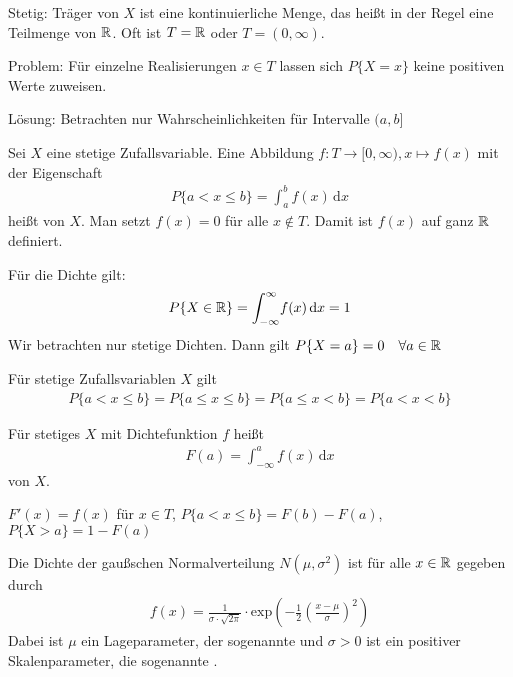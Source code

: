
Stetig: Träger von $X$ ist eine kontinuierliche Menge, das heißt in der Regel eine Teilmenge von $\mathbb{R}$. Oft ist $T = \mathbb{R}$ oder $T = (0, \infty)$.

\medskip
Problem: Für einzelne Realisierungen $x \in T$ lassen sich $P\{X = x\}$ keine positiven Werte zuweisen.

\medskip
Lösung: Betrachten nur Wahrscheinlichkeiten für Intervalle $(a, b]$

Sei $X$ eine stetige Zufallsvariable. Eine Abbildung $f:T \rightarrow [0, \infty), x \mapsto f(x)$ mit der Eigenschaft
\begin{align*}
    P\{a < x \leq b\} = \int_a^b \! f(x) \, \mathrm{d}x
\end{align*}
heißt  von $X$. Man setzt $f(x) = 0$ für alle $x \not \in T$. Damit ist $f(x)$ auf ganz $\mathbb{R}$ definiert.

Für die Dichte gilt:
\begin{align*}
    P\{X \in \mathbb{R}\} = \int_{-\infty}^{\infty} \! f(x) \, \mathrm{d}x = 1
\end{align*}
Wir betrachten nur stetige Dichten. Dann gilt $P\{X = a\} = 0 \quad \forall a \in \mathbb{R}$

Für stetige Zufallsvariablen $X$ gilt 
\begin{align*}
    P\{a < x \leq b\} = P\{a \leq x \leq b\} = P\{a \leq x < b\} = P\{a < x < b\}
\end{align*}

Für stetiges $X$ mit Dichtefunktion $f$ heißt
\begin{align*}
    F(a) = \int_{-\infty}^a \! f(x) \, \mathrm{d}x
\end{align*}
 von $X$.


$F'(x) = f(x)$ für $x \in T$, $P\{a < x \leq b\} = F(b) - F(a)$, $P\{X > a\} = 1 - F(a)$

Die Dichte der gaußschen Normalverteilung $N(\mu, \sigma ^2)$ ist für alle $x \in \mathbb{R}$ gegeben durch
\begin{align*}
    f(x) = \frac{1}{\sigma \cdot \sqrt{2 \pi}} \cdot \text{exp}\left(-\frac{1}{2}\left(\frac{x-\mu}{\sigma}\right)^2\right)
\end{align*}
Dabei ist $\mu$ ein Lageparameter, der sogenannte  und $\sigma > 0$ ist ein positiver Skalenparameter, die sogenannte .

